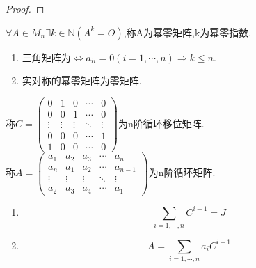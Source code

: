 \documentclass[UTF8,a4paper,notitlepage]{book}
\begin{document}
        \begin{proof}
        \end{proof}
        \begin{definition}
            $\forall A\in M_n \exists k\in \mathbb{N}(A^k=O)$,称A为幂零矩阵,k为幂零指数.
        \end{definition}
        \begin{property}[幂零矩阵的性质]\mbox{}\begin{enumerate}
            \item 三角矩阵为$\Leftrightarrow a_{ii}=0(i=1,\cdots,n) \Rightarrow k\leq n$.
            \item 实对称的幂零矩阵为零矩阵.
        \end{enumerate}\end{property}
        \begin{definition}[幂等矩阵]
        \end{definition}
        \begin{definition}[对合矩阵]
        \end{definition}
        \begin{definition}
            称$C=\begin{pmatrix} 0&1&0&\cdots&0\\ 0&0&1&\cdots&0\\ \vdots&\vdots&\vdots&\ddots&\vdots\\ 0&0&0&\cdots&1\\ 1&0&0&\cdots&0 \end{pmatrix}$为n阶循环移位矩阵.\\ 
            称$A=\begin{pmatrix} a_1&a_2&a_3&\cdots&a_n\\ a_n&a_1&a_2&\cdots&a_{n-1}\\ \vdots&\vdots&\vdots&\ddots&\vdots\\ a_2&a_3&a_4&\cdots&a_1\end{pmatrix}$为n阶循环矩阵.
        \end{definition}
        \begin{property}\mbox{}\begin{enumerate}
            \item $$\sum_{i=1,\cdots,n}C^{i-1}=J$$
            \item $$A=\sum_{i=1,\cdots,n}a_iC^{i-1}$$
        \end{enumerate}\end{property}
        \begin{definition}[随机矩阵]%
        \end{definition}
\end{document}

